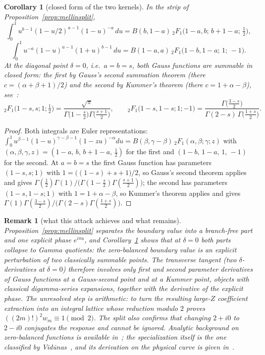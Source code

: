 \documentclass[10pt,a4paper]{amsart}
\newtheorem{corollary}[theorem]{Corollary}
\newtheorem{remark}[theorem]{Remark}
\begin{document}
\begin{corollary}[closed form of the two kernels]\label{cor:kernels}
In the strip of Proposition~\ref{prop:mellinsplit},
\[
 \int_0^1u^{b-1}(1-u/2)^{a-1}(1-u)^{-a}\,du
 =B(b,1-a)\,{}_2F_1\bigl(1-a,b;\,b+1-a;\,\tfrac12\bigr),
\]
\[
 \int_0^1u^{-a}(1-u)^{a-1}(1+u)^{b-1}\,du
 =B(1-a,a)\,{}_2F_1\bigl(1-b,1-a;\,1;\,-1\bigr).
\]
At the diagonal point $\delta=0$, i.e.\ $a=b=s$, both Gauss functions are summable in closed form: the first by Gauss's second summation theorem (there $c=(\alpha+\beta+1)/2$) and the second by Kummer's theorem (there $c=1+\alpha-\beta$), see~\cite[Sec.~3.1]{AndrewsAskeyRoy}:
\[
 {}_2F_1\bigl(1-s,s;1;\tfrac12\bigr)
 =\frac{\sqrt\pi}{\Gamma\bigl(1-\frac s2\bigr)
                    \Gamma\bigl(\frac{s+1}2\bigr)},
 \qquad
 {}_2F_1\bigl(1-s,1-s;1;-1\bigr)
 =\frac{\Gamma\bigl(\frac{3-s}2\bigr)}
        {\Gamma(2-s)\,\Gamma\bigl(\frac{1+s}2\bigr)} .
\]
\end{corollary}

\begin{proof}
Both integrals are Euler representations: $\int_0^1u^{\beta-1}(1-u)^{\gamma-\beta-1}(1-zu)^{-\alpha}du =B(\beta,\gamma-\beta)\,{}_2F_1(\alpha,\beta;\gamma;z)$ with $(\alpha,\beta,\gamma,z)=(1-a,\,b,\,b+1-a,\,\tfrac12)$ for the first and $(1-b,\,1-a,\,1,\,-1)$ for the second.  At $a=b=s$ the first Gauss function has parameters $(1-s,s;1)$ with $1=\bigl((1-s)+s+1\bigr)/2$, so Gauss's second theorem applies and gives $\Gamma(\tfrac12)\Gamma(1)/\bigl(\Gamma(1-\tfrac s2) \Gamma(\tfrac{s+1}2)\bigr)$; the second has parameters $(1-s,1-s;1)$ with $1=1+\alpha-\beta$, so Kummer's theorem applies and gives $\Gamma(1)\Gamma(\tfrac{3-s}2)/\bigl(\Gamma(2-s)\Gamma(\tfrac{1+s}2)\bigr)$.
\end{proof}

\begin{remark}[what this attack achieves and what remains]
Proposition~\ref{prop:mellinsplit} separates the boundary value into a branch-free part and one explicit phase $e^{i\pi a}$, and Corollary~\ref{cor:kernels} shows that at $\delta=0$ both parts collapse to Gamma quotients: the zero-balanced boundary value is an explicit perturbation of two classically summable points.  The transverse tangent (two $\delta$-derivatives at $\delta=0$) therefore involves only first and second parameter derivatives of Gauss functions at a
Gauss-second point and at a Kummer point, objects with classical digamma-series expansions, together with the derivative of the explicit phase.  The unresolved step is arithmetic: to turn the resulting large-$Z$ coefficient extraction into an integral lattice whose reduction modulo $2$ proves $((2m)!)^2w_m\equiv1\pmod2$.  The split also confirms that changing $2+i0$ to $2-i0$ conjugates the response and cannot be ignored.  Analytic background on zero-balanced functions is available in~\cite{AndersonEtAl,SimicVuorinen}; the specialization itself is the one classified by Vid\=unas~\cite{VidunasAppell}, and its derivation on the physical curve is given in~\cite{Ultraspherical}.
\end{remark}
\end{document}
